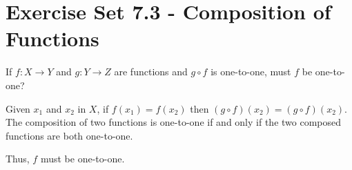 \documentclass[12pt]{article}
\newenvironment{modenumerate}
  {\enumerate\setupmodenumerate}
  {\endenumerate}
\newif\ifmoditem
\newcommand{\setupmodenumerate}{%
  \global\moditemfalse
  \let\origmakelabel\makelabel
  \def\moditem##1{\global\moditemtrue\def\mesymbol{##1}\item}%
  \def\makelabel##1{%
    \origmakelabel{##1\ifmoditem\rlap{\mesymbol}\fi\enspace}%
    \global\moditemfalse}%
}
\begin{document}
\section*{Exercise Set 7.3 - Composition of Functions}
\begin{modenumerate}
\setcounter{enumi}{15}
\item %
\item %
\moditem{*} %
If $f : X \rightarrow Y$ and $g : Y \rightarrow Z$ are functions and $g \circ f$ is one-to-one, must $f$ be
one-to-one?

Given $x_{1}$ and $x_{2}$ in $X$, if $f(x_{1}) = f(x_{2})$ then $(g \circ f)(x_{2}) = (g \circ f)(x_{2})$. The
composition of two functions is one-to-one if and only if the two composed functions are both one-to-one.

Thus, $f$ must be one-to-one.
\item %
\end{modenumerate}
\end{document}
